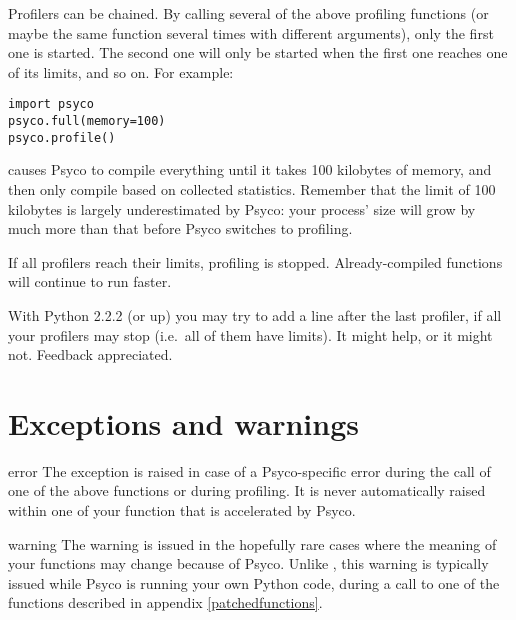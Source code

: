 \documentclass{manual}
\begin{document}
Profilers can be chained.  By calling several of the above profiling functions (or maybe the same function several times with different arguments), only the first one is started.  The second one will only be started when the first one reaches one of its limits, and so on.  For example:

\begin{verbatim}
import psyco
psyco.full(memory=100)
psyco.profile()
\end{verbatim}

causes Psyco to compile everything until it takes 100 kilobytes of memory, and then only compile based on collected statistics.  Remember that the limit of 100 kilobytes is largely underestimated by Psyco: your process' size will grow by much more than that before Psyco switches to profiling.

If all profilers reach their limits, profiling is stopped.  Already-compiled functions will continue to run faster.

With Python 2.2.2 (or up) you may try to add a line  after the last profiler, if all your profilers may stop (i.e.\ all of them have limits).  It might help, or it might not.  Feedback appreciated.



\section{Exceptions and warnings}

\begin{excdesc}{error}
  The  exception is raised in case of a Psyco-specific error during the call of one of the above functions or during profiling.  It is never automatically raised within one of your function that is accelerated by Psyco.
\end{excdesc}

\begin{excdesc}{warning}
  The  warning is issued in the hopefully rare cases where the meaning of your functions may change because of Psyco.  Unlike , this warning is typically issued while Psyco is running your own Python code, during a call to one of the functions described in appendix \ref{patchedfunctions}.
\end{excdesc}
\end{document}
